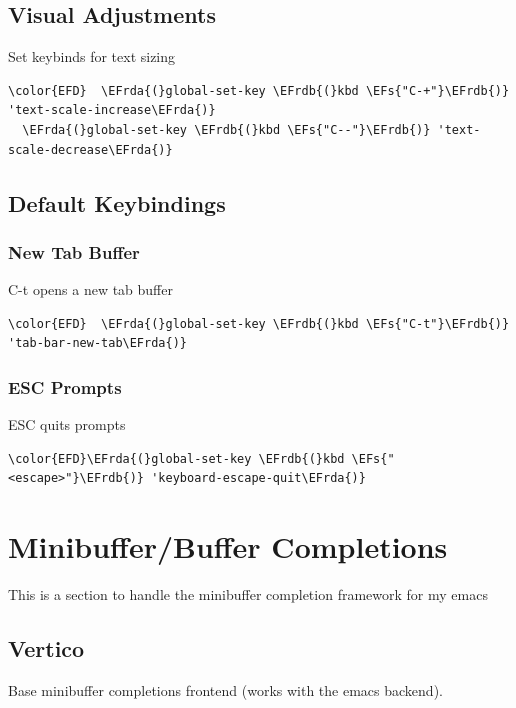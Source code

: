 \documentclass[11pt]{article}
\newcommand{\EFs}[1]{\textcolor{EFs}{#1}} %
\newcommand{\EFrda}[1]{\textcolor{EFrda}{#1}} %
\newcommand{\EFrdb}[1]{\textcolor{EFrdb}{#1}} %
\begin{document}
\subsection{Visual Adjustments}
\label{sec:org2185b36}
Set keybinds for text sizing
\begin{Code}
\begin{Verbatim}
\color{EFD}  \EFrda{(}global-set-key \EFrdb{(}kbd \EFs{"C-+"}\EFrdb{)} 'text-scale-increase\EFrda{)}
  \EFrda{(}global-set-key \EFrdb{(}kbd \EFs{"C--"}\EFrdb{)} 'text-scale-decrease\EFrda{)}
\end{Verbatim}
\end{Code}

\subsection{Default Keybindings}
\label{sec:org134bffb}
\subsubsection{New Tab Buffer}
\label{sec:org64f3034}
C-t opens a new tab buffer
\begin{Code}
\begin{Verbatim}
\color{EFD}  \EFrda{(}global-set-key \EFrdb{(}kbd \EFs{"C-t"}\EFrdb{)} 'tab-bar-new-tab\EFrda{)}
\end{Verbatim}
\end{Code}
\subsubsection{ESC Prompts}
\label{sec:org9ddd2a3}
ESC quits prompts
\begin{Code}
\begin{Verbatim}
\color{EFD}\EFrda{(}global-set-key \EFrdb{(}kbd \EFs{"<escape>"}\EFrdb{)} 'keyboard-escape-quit\EFrda{)}
\end{Verbatim}
\end{Code}
\section{Minibuffer/Buffer Completions}
\label{sec:org35e4f28}
This is a section to handle the minibuffer completion framework for my emacs
\subsection{Vertico}
\label{sec:org08ede7b}
Base minibuffer completions frontend (works with the emacs backend).
\end{document}
